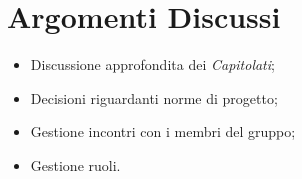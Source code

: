\section{Argomenti Discussi}
	\begin{itemize}
		\item Discussione approfondita dei \textit{Capitolati\glos};
		\item Decisioni riguardanti norme di progetto;
		\item Gestione incontri con i membri del gruppo;
		\item Gestione ruoli.
	\end{itemize}